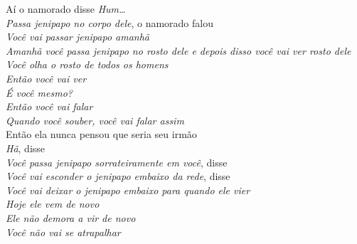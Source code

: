 \begin{linenumbers}\begingroup\raggedright
\noindent Aí o namorado disse \emph{Hum\ldots{}}\\
\emph{Passa jenipapo no corpo dele}, o namorado falou\\
\emph{Você vai passar jenipapo amanhã}\\
\emph{Amanhã você passa jenipapo no rosto dele e depois disso você vai
ver rosto dele}\\
\emph{Você olha o rosto de todos os homens}\\
\emph{Então você vai ver}\\
\emph{É você mesmo?}\\
\emph{Então você vai falar}\\
\emph{Quando você souber, você vai falar assim}\\
Então ela nunca pensou que seria seu irmão\\
\emph{Hã}, disse\\
\emph{Você passa jenipapo sorrateiramente em você}, disse\\
\emph{Você vai esconder o jenipapo embaixo da rede}, disse\\
\emph{Você vai deixar o jenipapo embaixo para quando ele vier}\\
\emph{Hoje ele vem de novo}\\
\emph{Ele não demora a vir de novo}\\
\emph{Você não vai se atrapalhar}
\end{linenumbers}\endgroup

